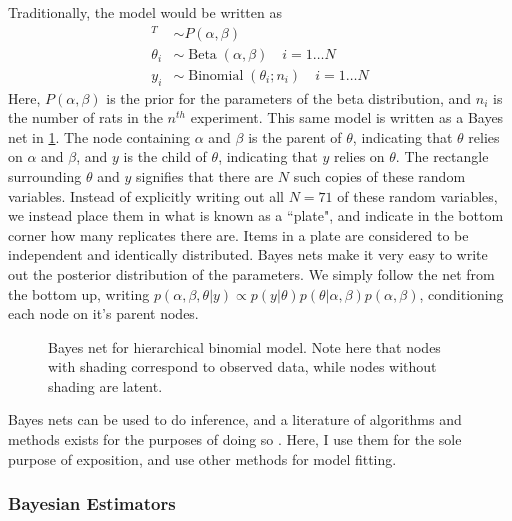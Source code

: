 Traditionally, the model would be written as 
%
\begin{align*}
	[\alpha,\beta]^T &\sim P(\alpha, \beta) \\
	\theta_i &\sim \operatorname{Beta}(\alpha,\beta) \quad i = 1 \dots N\\
	y_i &\sim \operatorname{Binomial}(\theta_i ; n_i) \quad i = 1 \dots N
	\end{align*}
%
Here, $ P(\alpha, \beta)  $ is the prior for the parameters of the beta distribution, and $ n_i $ is the number of rats in the $ n^{th} $ experiment.  This same model is written as a Bayes net in \cref{bayesnet}.   The node containing $ \alpha $ and $ \beta $ is the parent of $ \theta $, indicating that $ \theta $ relies on $ \alpha $ and $ \beta $, and $ y $ is the child of $ \theta $, indicating that $ y $ relies on $ \theta $.  The rectangle surrounding $ \theta $ and $ y $ signifies that there are $ N $ such copies of these random variables.  Instead of explicitly writing out all $ N=71 $ of these random variables, we instead place them in what is known as a ``plate", and indicate in the bottom corner how many replicates there are.  Items in a plate are considered to be independent and identically distributed.  Bayes nets make it very easy to write out the posterior distribution of the parameters.  We simply follow the net from the bottom up, writing $ p(\alpha,\beta, \theta \vert y) \propto p(y\vert \theta)p(\theta \vert \alpha, \beta)p(\alpha,\beta) $, conditioning each node on it's parent nodes.

\begin{figure}[h!]

	\centering
	\caption{Bayes net for hierarchical binomial model.  Note here that nodes with shading correspond to observed data, while nodes without shading are latent.}
	\label{bayesnet}
\end{figure}

Bayes nets can be used to do inference, and a literature of algorithms and methods exists for the purposes of doing so \cite{Bishop2006pattern,koller2009probabilistic}.  Here, I use them for the sole purpose of exposition, and use other methods for model fitting.


\subsubsection{Bayesian Estimators}


